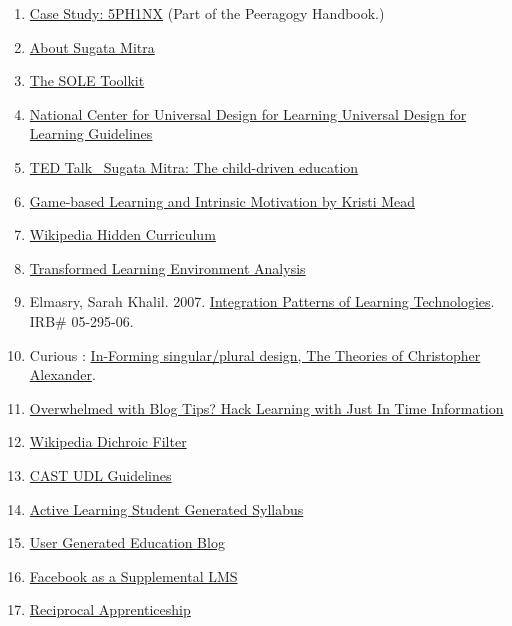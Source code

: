 \begin{enumerate}
\itemsep1pt\parskip0pt
\item
  \href{http://peeragogy.org/case-study-5ph1nx/}{Case Study: 5PH1NX}
  (Part of the Peeragogy Handbook.)
\item
  \href{http://sugatam.wikispaces.com/}{About Sugata Mitra}
\item
  \href{http://www.ted.com/pages/sole_toolkit}{The SOLE Toolkit}
\item
  \href{http://www.udlcenter.org/aboutudl/udlguidelines}{National Center
  for Universal Design for Learning \textbar{} Universal Design for
  Learning Guidelines}
\item
  \href{http://www.ted.com/talks/sugata_mitra_the_child_driven_education.html}{TED
  Talk \textbar{}~Sugata Mitra: The child-driven education}
\item
  \href{http://www.academia.edu/1137269/Game-based_Learning_and_Intrinsic_Motivation}{Game-based
  Learning and Intrinsic Motivation by Kristi Mead}
\item
  \href{http://en.wikipedia.org/wiki/Hidden_curriculum}{Wikipedia
  \textbar{} Hidden Curriculum}
\item
  \href{http://www.scribd.com/doc/181089012/Transformed-Learning-Environment-Analysis}{Transformed
  Learning Environment Analysis}
\item
  Elmasry, Sarah Khalil. 2007.
  \href{http://scholar.lib.vt.edu/theses/available/etd-09232007-220306/unrestricted/SElmasryETDbodytext.pdf}{Integration
  Patterns of Learning Technologies}. IRB\# 05-295-06.
\item
  Curious :
  \href{http://nourdiab.wordpress.com/2011/02/23/the-theories-of-christopher-alexander/}{In-Forming
  singular/plural design, The Theories of Christopher Alexander}.
\item
  \href{http://www.wordstream.com/blog/ws/2013/10/02/just-in-time-information-hacks}{Overwhelmed
  with Blog Tips? Hack Learning with Just In Time Information}
\item
  \href{http://en.wikipedia.org/wiki/Dichroic_filter}{Wikipedia
  \textbar{} Dichroic Filter}
\item
  \href{http://www.cast.org/library/UDLguidelines/}{CAST \textbar{} UDL
  Guidelines}
\item
  \href{http://www.theatreprof.com/2011/active-learning-student-generated-syllabus/}{Active
  Learning Student Generated Syllabus}
\item
  \href{http://usergeneratededucation.wordpress.com/}{User Generated
  Education Blog}
\item
  \href{http://community.telecentre.org/profiles/blogs/facebook-as-a-supplemental-lms}{Facebook
  as a Supplemental LMS}
\item
  \href{http://starwars.wikia.com/wiki/Reciprocal_apprenticeship}{Reciprocal
  Apprenticeship}
\end{enumerate}
